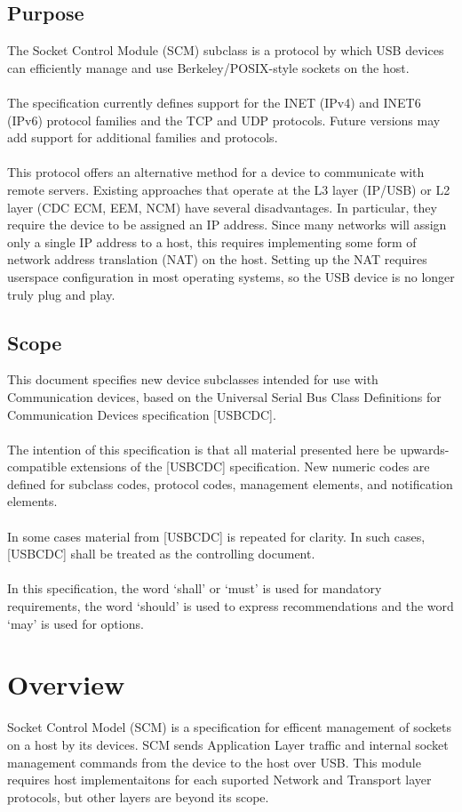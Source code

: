 \documentclass[10pt]{article}
\begin{document}
	\subsection{Purpose}
	The Socket Control Module (SCM) subclass is a protocol by which USB devices can efficiently manage and use Berkeley/POSIX-style sockets on the host.\\
	\\
	The specification currently defines support for the INET (IPv4) and INET6 (IPv6) protocol families and the TCP and UDP protocols. Future versions may add support for additional families and protocols.\\
	\\
	This protocol offers an alternative method for a device to communicate with remote servers. Existing approaches that operate at the L3 layer (IP/USB) or L2 layer (CDC ECM, EEM, NCM) have several disadvantages.  In particular, they require the device to be assigned an IP address.  Since many networks will assign only a single IP address to a host, this requires implementing some form of network address translation (NAT) on the host.  Setting up the NAT requires userspace configuration in most operating systems, so the USB device is no longer truly plug and play.
	\subsection{Scope}
	This document specifies new device subclasses intended for use with Communication devices,
	based on the Universal Serial Bus Class Definitions for Communication Devices specification
	[USBCDC]. \\
	\\
	The intention of this specification is that all material presented here be upwards-compatible
	extensions of the [USBCDC] specification. New numeric codes are defined for subclass codes,
	protocol codes, management elements, and notification elements. \\
	\\
	In some cases material from [USBCDC] is repeated for clarity. In such cases, [USBCDC] shall be
	treated as the controlling document. \\
	\\
	In this specification, the word ‘shall’ or ‘must’ is used for mandatory requirements, the word
	‘should’ is used to express recommendations and the word ‘may’ is used for options. 
	\section{Overview}
	Socket Control Model (SCM) is a specification for efficent management of sockets on a host by its devices. SCM sends Application Layer traffic and internal socket management commands from the device to the host over USB. This module requires host implementaitons for each suported Network and Transport layer protocols, but other layers are beyond its scope.
\end{document}
